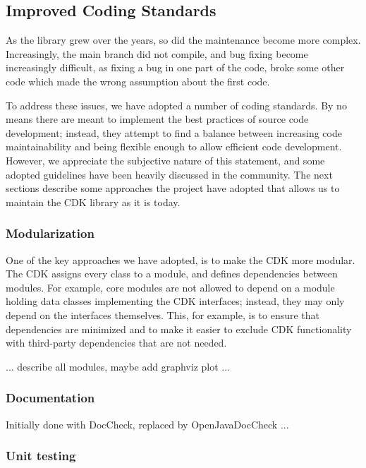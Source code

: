 \documentclass[10pt]{bmc_article}
\newenvironment{bmcformat}{\begin{raggedright}\baselineskip20pt\sloppy\setboolean{publ}{false}}{\end{raggedright}\baselineskip20pt\sloppy}
\begin{document}
\begin{bmcformat}
\subsection*{Improved Coding Standards}

As the library grew over the years, so did the maintenance become more complex. Increasingly,
the main branch did not compile, and bug fixing become increasingly difficult, as fixing a bug
in one part of the code, broke some other code which made the wrong assumption about the first
code.

To address these issues, we have adopted a number of coding standards. By no means there are
meant to implement the best practices of source code development; instead, they attempt to find
a balance between increasing code maintainability and being flexible enough to allow efficient
code development. However, we appreciate the subjective nature of this statement, and some
adopted guidelines have been heavily discussed in the community.
The next sections describe some approaches the project have adopted that allows us to
maintain the CDK library as it is today. 

  \subsubsection*{Modularization}
  
One of the key approaches we have adopted, is to make the CDK more modular. The CDK assigns
every class to a module, and defines dependencies between modules. For example, core modules
are not allowed to depend on a module holding data classes implementing the CDK interfaces;
instead, they may only depend on the interfaces themselves. This, for example, is to ensure
that dependencies are minimized and to make it easier to exclude CDK functionality with
third-party dependencies that are not needed.

... describe all modules, maybe add graphviz plot ...


  \subsubsection*{Documentation}

  Initially done with DocCheck, replaced by OpenJavaDocCheck ...

  \subsubsection*{Unit testing}




\end{bmcformat}
\end{document}
